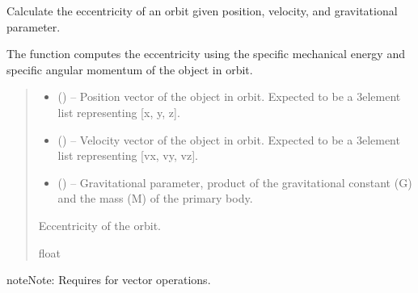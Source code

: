 \documentclass[letterpaper,10pt,english]{sphinxmanual}
\begin{document}
\begin{fulllineitems}
\label{\detokenize{fspsim.utils:fspsim.utils.Conversions.calculate_eccentricity}}
\pysigstartsignatures
{}
\pysigstopsignatures
\sphinxAtStartPar
Calculate the eccentricity of an orbit given position, velocity, and gravitational parameter.

\sphinxAtStartPar
The function computes the eccentricity using the specific mechanical energy and specific angular momentum
of the object in orbit.
\begin{quote}\begin{description}
\begin{itemize}
\item {} 
\sphinxAtStartPar
{} (\sphinxstyleliteralemphasis{\sphinxupquote{{[}}}\sphinxstyleliteralemphasis{\sphinxupquote{{]}}}) – Position vector of the object in orbit. Expected to be a 3\sphinxhyphen{}element list representing {[}x, y, z{]}.

\item {} 
\sphinxAtStartPar
{} (\sphinxstyleliteralemphasis{\sphinxupquote{{[}}}\sphinxstyleliteralemphasis{\sphinxupquote{{]}}}) – Velocity vector of the object in orbit. Expected to be a 3\sphinxhyphen{}element list representing {[}vx, vy, vz{]}.

\item {} 
\sphinxAtStartPar
{} () – Gravitational parameter, product of the gravitational constant (G) and the mass (M) of the primary body.

\end{itemize}

\sphinxAtStartPar
Eccentricity of the orbit.

\sphinxAtStartPar
float

\end{description}\end{quote}

\begin{sphinxadmonition}{note}{Note:}
\sphinxAtStartPar
Requires  for vector operations.
\end{sphinxadmonition}

\end{fulllineitems}
\end{document}
